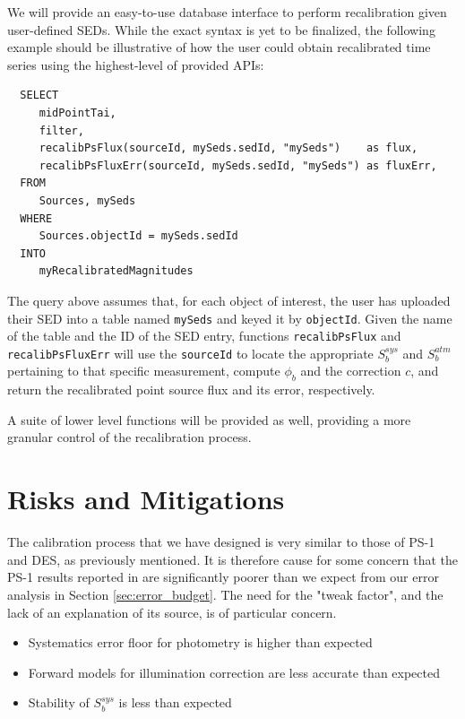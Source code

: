 \documentclass[12pt,preprint]{aastex}
\begin{document}
We will provide an easy-to-use database interface to perform recalibration given user-defined SEDs. While the exact syntax is yet to be finalized, the following example should be illustrative of how the user could obtain recalibrated time series using the highest-level of provided APIs:
%
\begin{verbatim}
  SELECT
     midPointTai,
     filter,
     recalibPsFlux(sourceId, mySeds.sedId, "mySeds")    as flux,
     recalibPsFluxErr(sourceId, mySeds.sedId, "mySeds") as fluxErr,
  FROM
     Sources, mySeds
  WHERE
     Sources.objectId = mySeds.sedId
  INTO
     myRecalibratedMagnitudes
\end{verbatim}
%
The query above assumes that, for each object of interest, the user has uploaded their SED into a table named {\tt mySeds} and keyed it by {\tt objectId}. Given the name of the table and the ID of the SED entry, functions {\tt recalibPsFlux} and {\tt recalibPsFluxErr} will use the {\tt sourceId} to locate the appropriate $S_b^{sys}$ and $S_b^{atm}$ pertaining to that specific measurement, compute $\phi_b$ and the correction $c$, and return the recalibrated point source flux and its error, respectively.

A suite of lower level functions will be provided as well, providing a more granular control of the recalibration process.

\section{Risks and Mitigations}
\label{sec:risks}
The calibration process that we have designed is very similar to those of PS-1 and DES, as previously mentioned.  It is therefore
cause for some concern that the PS-1 results reported in \citep{Tonry2012} are significantly poorer than we expect from our
error analysis in Section \ref{sec:error_budget}.  The need for the "tweak factor", and the lack of an explanation of its source, is of particular concern.

\begin{itemize}
\item Systematics error floor for photometry is higher than expected
\item Forward models for illumination correction are less accurate than expected
\item Stability of $S_b^{sys}$ is less than expected
\end{itemize}



\end{document}
